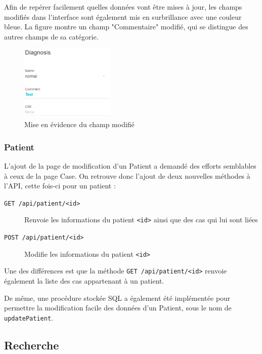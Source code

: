 			Afin de repérer facilement quelles données vont être mises à jour, les champs modifiés dans l'interface sont également mis en surbrillance avec une couleur bleue. La figure montre un champ "Commentaire" modifié, qui se distingue des autres champs de sa catégorie.

			\begin{figure}[!h]
				\centering
				\includegraphics[width=0.4\textwidth]{images/realisation/proto2_3}
				\caption{Mise en évidence du champ modifié}
				\label{proto2_3}
			\end{figure}

		\subsubsection{Patient}

			L'ajout de la page de modification d'un Patient a demandé des efforts semblables à ceux de la page Case. On retrouve donc l'ajout de deux nouvelles méthodes à l'API, cette fois-ci pour un patient :

			\begin{description}
				\item[\texttt{GET /api/patient/<id>}] Renvoie les informations du patient \texttt{<id>} ainsi que des cas qui lui sont liées
				\item[\texttt{POST /api/patient/<id>}] Modifie les informations du patient \texttt{<id>}
			\end{description}

			Une des différences est que la méthode \texttt{GET /api/patient/<id>} renvoie également la liste des cas appartenant à un patient.

			De même, une procédure stockée SQL a également été implémentée pour permettre la modification facile des données d'un Patient, sous le nom de \texttt{updatePatient}.

	\subsection{Recherche}

